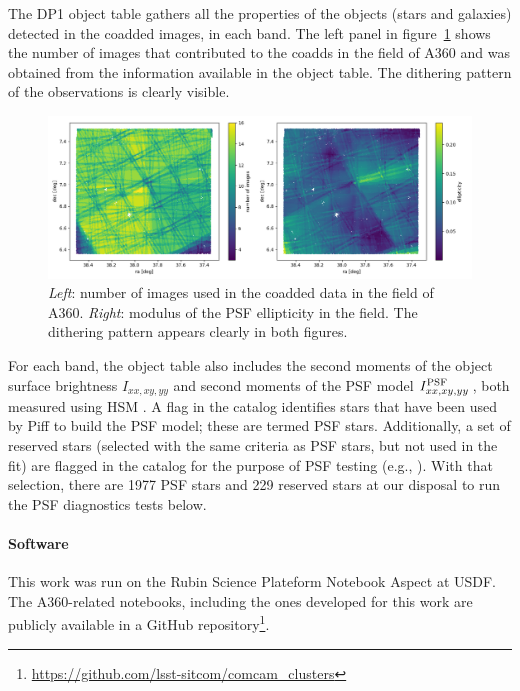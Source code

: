 \documentclass[SE,lsstdraft,authoryear,toc]{lsstdoc}
\begin{document}
The DP1 object table gathers all the properties of the objects (stars and galaxies) detected in the coadded images, in each band. The left panel in figure~\ref{fig:dither} shows the number of images that contributed to the coadds in the field of A360 and was obtained from the  information available in the object table. The dithering pattern of the observations is clearly visible.
\begin{figure}
\includegraphics[width=\textwidth]{Figures/psf_ellipticity_visits.png}
\caption{\emph{Left}: number of images used in the coadded data in the field of A360. \emph{Right}: modulus of the PSF ellipticity in the field. The dithering pattern appears clearly in both figures.\label{fig:dither}}
\end{figure}

For each band, the object table also includes the second moments of the object surface brightness $I_{xx,xy,yy}$ and second moments of the PSF model $I_{xx,xy,yy}^{\rm PSF}\,$, both measured using HSM \citep{2003MNRAS.343..459H, 2005MNRAS.361.1287M, 2018MNRAS.481.3170M}. A flag in the catalog identifies stars that have been used by Piff to build the PSF model; these are termed PSF stars. Additionally, a set of reserved stars (selected with the same criteria as PSF stars, but not used in the fit) are flagged in the catalog for the purpose of PSF testing (e.g., \citealp{2025OJAp....8E..26S}). 
With that selection, there are 1977 PSF stars and 229 reserved stars at our disposal to run the PSF diagnostics tests below. 

\paragraph{Software} This work was run on the Rubin Science Plateform Notebook Aspect at USDF. The A360-related notebooks, including the ones developed for this work are publicly available in a GitHub repository\footnote{\url{https://github.com/lsst-sitcom/comcam_clusters}}.
\end{document}
